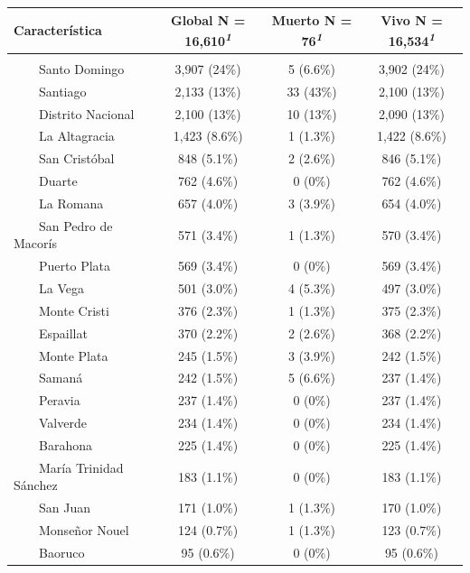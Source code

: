 \documentclass[
  letterpaper,
  DIV=11,
  numbers=noendperiod]{scrreprt}
\begin{document}
\begin{table}
\fontsize{12.0pt}{14.4pt}\selectfont
\begin{tabular*}{\linewidth}{@{\extracolsep{\fill}}lccc}
\toprule
\textbf{Característica} & \textbf{Global}  N = 16,610\textsuperscript{\textit{1}} & \textbf{Muerto}  N = 76\textsuperscript{\textit{1}} & \textbf{Vivo}  N = 16,534\textsuperscript{\textit{1}} \\ 
\midrule\addlinespace[2.5pt]
{\bfseries Provincia de residencia del caso} &  &  &  \\ 
    Santo Domingo & 3,907 (24\%) & 5 (6.6\%) & 3,902 (24\%) \\ 
    Santiago & 2,133 (13\%) & 33 (43\%) & 2,100 (13\%) \\ 
    Distrito Nacional & 2,100 (13\%) & 10 (13\%) & 2,090 (13\%) \\ 
    La Altagracia & 1,423 (8.6\%) & 1 (1.3\%) & 1,422 (8.6\%) \\ 
    San Cristóbal & 848 (5.1\%) & 2 (2.6\%) & 846 (5.1\%) \\ 
    Duarte & 762 (4.6\%) & 0 (0\%) & 762 (4.6\%) \\ 
    La Romana & 657 (4.0\%) & 3 (3.9\%) & 654 (4.0\%) \\ 
    San Pedro de Macorís & 571 (3.4\%) & 1 (1.3\%) & 570 (3.4\%) \\ 
    Puerto Plata & 569 (3.4\%) & 0 (0\%) & 569 (3.4\%) \\ 
    La Vega & 501 (3.0\%) & 4 (5.3\%) & 497 (3.0\%) \\ 
    Monte Cristi & 376 (2.3\%) & 1 (1.3\%) & 375 (2.3\%) \\ 
    Espaillat & 370 (2.2\%) & 2 (2.6\%) & 368 (2.2\%) \\ 
    Monte Plata & 245 (1.5\%) & 3 (3.9\%) & 242 (1.5\%) \\ 
    Samaná & 242 (1.5\%) & 5 (6.6\%) & 237 (1.4\%) \\ 
    Peravia & 237 (1.4\%) & 0 (0\%) & 237 (1.4\%) \\ 
    Valverde & 234 (1.4\%) & 0 (0\%) & 234 (1.4\%) \\ 
    Barahona & 225 (1.4\%) & 0 (0\%) & 225 (1.4\%) \\ 
    María Trinidad Sánchez & 183 (1.1\%) & 0 (0\%) & 183 (1.1\%) \\ 
    San Juan & 171 (1.0\%) & 1 (1.3\%) & 170 (1.0\%) \\ 
    Monseñor Nouel & 124 (0.7\%) & 1 (1.3\%) & 123 (0.7\%) \\ 
    Baoruco & 95 (0.6\%) & 0 (0\%) & 95 (0.6\%) \\ 

\end{tabular*}
\end{table}
\end{document}
